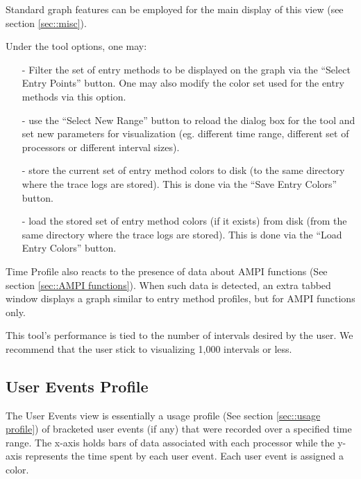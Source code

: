 \documentclass[10pt]{report}
\begin{document}
Standard graph features can be employed for the main display of this
view (see section \ref{sec::misc}).

Under the tool options, one may:

\begin{itemize}
\item[-] Filter the set of entry methods to be displayed on the graph via
the ``Select Entry Points'' button. One may also modify the color set used
for the entry methods via this option.
\item[-] use the ``Select New Range'' button to reload the dialog box
for the tool and set new parameters for visualization (eg. different
time range, different set of processors or different interval sizes).
\item[-] store the current set of entry method colors to disk (to the
same directory where the trace logs are stored). This is done via the
``Save Entry Colors'' button.
\item[-] load the stored set of entry method colors (if it exists)
from disk (from the same directory where the trace logs are
stored). This is done via the ``Load Entry Colors'' button.
\end{itemize}

Time Profile also reacts to the presence of data about AMPI
functions (See section \ref{sec::AMPI functions}). When such data is
detected, an extra tabbed window displays a graph similar to entry
method profiles, but for AMPI functions only.

This tool's performance is tied to the number of intervals desired by
the user. We recommend that the user stick to visualizing 1,000
intervals or less.

\subsection{User Events Profile}

The User Events view is essentially a usage profile (See section
\ref{sec::usage profile}) of bracketed user events (if any) that were
recorded over a specified time range. The x-axis holds bars of data
associated with each processor while the y-axis represents the time
spent by each user event. Each user event is assigned a color.
\end{document}
